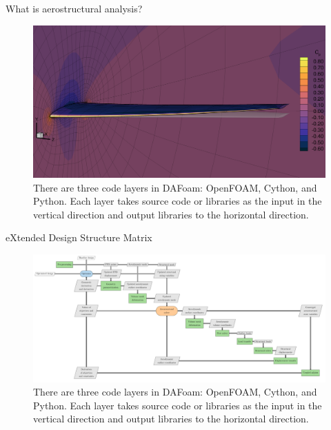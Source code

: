 \documentclass{bredelebeamer}
\begin{document}
\begin{frame}{What is aerostructural analysis?}
\begin{figure}
\includegraphics[width=1.05\linewidth]{images/aerostruct-resultDeformed.png} 
\caption{There are three code layers in DAFoam: OpenFOAM, Cython, and Python. Each layer takes source code or libraries as the input in the vertical direction and output libraries to the horizontal direction.}
\end{figure}
\end{frame}

\begin{frame}{eXtended Design Structure Matrix}
\begin{figure}
\includegraphics[width=1.0\linewidth]{images/aerostruct-xdsm.pdf} 
\caption{There are three code layers in DAFoam: OpenFOAM, Cython, and Python. Each layer takes source code or libraries as the input in the vertical direction and output libraries to the horizontal direction.}
\end{figure}
\end{frame}
\end{document}
